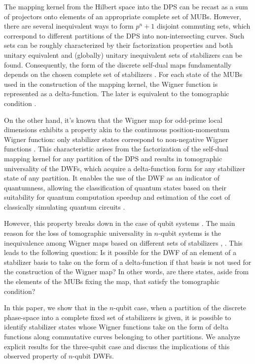 \documentclass{article}
\begin{document}
The mapping kernel from the Hilbert space into the DPS can be recast as a sum of
projectors onto elements of an appropriate complete set of MUBs. However, there
are several inequivalent ways to form $p^{n}+1$ disjoint commuting sets,
which correspond to different partitions of the DPS into non-intersecting
curves. Such sets can be roughly characterized by their factorization
properties and both unitary equivalent and (globally) unitary inequivalent
sets of stabilizers can be found. Consequently, the form of the discrete
self-dual maps fundamentally depends on the chosen complete set of
stabilizers \cite{Bjork2007}. For each state of the MUBs used in the
construction of the mapping kernel, the Wigner function is represented as a
delta-function. The later is equivalent to the tomographic condition \cite%
{gibbons,galvao,cormick,DFW11,DFW12}.

On the other hand, it's known that the Wigner map for odd-prime local
dimensions exhibits a property akin to the continuous position-momentum
Wigner function: only stabilizer states correspond to non-negative Wigner
functions \cite{gross}. This characteristic arises from the factorization of
the self-dual mapping kernel for any partition of the DPS and results in
tomographic universality of the DWFs, which acquire a delta-function form
for any stabilizer state of any partition. It enables the use of the DWF as
an indicator of quantumness, allowing the classification of quantum states
based on their suitability for quantum computation speedup and estimation of
the cost of classically simulating quantum circuits \cite{Raus17,UniqueWF,
cohomo, contextMagic, WignerContext}.

However, this property breaks down in the case of qubit systems \cite{
UniqueWF, cohomo,contextMagic}. The main reason for the loss of tomographic
universality in $n$-qubit systems is the inequivalence among Wigner maps
based on different sets of stabilizers \cite{Bjork2007}, \cite{qip17}. This
leads to the following question: Is it possible for the DWF of an element of
a stabilizer basis to take on the form of a delta-function if that basis is
not used for the construction of the Wigner map? In other words, are there
states, aside from the elements of the MUBs fixing the map, that satisfy the
tomographic condition?

In this paper, we show that in the $n$-qubit case, when a partition of the
discrete phase-space into a complete fixed set of stabilizers is given, it
is possible to identify stabilizer states whose Wigner functions take on the
form of delta functions along commutative curves belonging to other
partitions. We analyze explicit results for the three-qubit case and discuss
the implications of this observed property of $n$-qubit DWFs.
\end{document}
